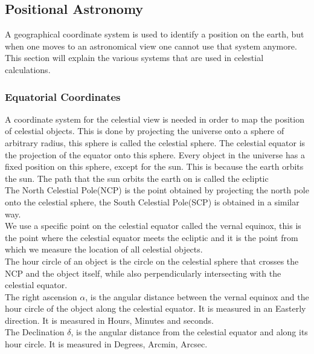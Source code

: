 \subsection{Positional Astronomy}
A geographical coordinate system is used to identify a position on the earth, but when one moves to an astronomical view one cannot use that system anymore. This section will explain the various systems that are used in celestial calculations.
\subsubsection{Equatorial Coordinates}
A coordinate system for the celestial view is needed in order to map the position of celestial objects. This is done by projecting the universe onto a sphere of arbitrary radius, this sphere is called the celestial sphere. The celestial equator is the projection of the equator onto this sphere. Every object in the universe has a fixed position on this sphere, except for the sun. This is because the earth orbits the sun. The path that the sun orbits the earth on is called the ecliptic\\ The North Celestial Pole(NCP) is the point obtained by projecting the north pole onto the celestial sphere, the South Celestial Pole(SCP) is obtained in a similar way. \\
We use a specific point on the celestial equator called the vernal equinox, this is the point where the celestial equator meets the ecliptic and it is the point from which we measure the location of all celestial objects. \\
The hour circle of an object is the circle on the celestial sphere that crosses the NCP and the object itself, while also perpendicularly intersecting with the celestial equator. 
\\
The right ascension $\alpha$, is the angular distance between the vernal equinox and the hour circle of the object along the celestial equator. It is measured in an Easterly direction. It is measured in Hours, Minutes and seconds.\\
The Declination $\delta$, is the angular distance from the celestial equator and along its hour circle. It is measured in Degrees, Arcmin, Arcsec.
